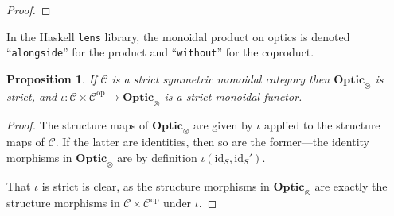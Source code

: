 \documentclass[11pt,letterpaper]{article}
\theoremstyle{plain}
\newtheorem{proposition}[theorem]{Proposition}
\theoremstyle{definition}
\newcommand{\C}{\mathscr{C}}
\newcommand{\lenslib}{\texttt{lens}}
\newcommand{\Optic}{\mathbf{Optic}}
\newcommand{\id}{\mathrm{id}}
\newcommand{\op}{\mathrm{op}}
\newcommand{\rep}[2]{{\ensuremath \left\langle #1 \mid #2 \right\rangle}}
\newcommand{\hto}{\ensuremath{\,\mathaccent\shortmid\rightarrow\,}}
\newcommand{\todo}[1]{\textcolor{red}{\small #1}}
\begin{document}
\begin{proof}
%
\end{proof}

  In the Haskell \lenslib{} library, the monoidal product on optics is denoted ``\texttt{alongside}'' for the product and ``\texttt{without}'' for the coproduct.

\begin{proposition}
  If $\C$ is a strict symmetric monoidal category then $\Optic_\otimes$ is strict, and $\iota : \C \times \C^\op \to \Optic_\otimes$ is a strict monoidal functor.
\end{proposition}
\begin{proof}
  The structure maps of $\Optic_\otimes$ are given by $\iota$ applied to the structure maps of $\C$. If the latter are identities, then so are the former---the identity morphisms in $\Optic_\otimes$ are by definition $\iota(\id_S, \id_S')$.
  
  That $\iota$ is strict is clear, as the structure morphisms in $\Optic_\otimes$ are exactly the structure morphisms in $\C \times \C^\op$ under $\iota$.
\end{proof}
\end{document}
